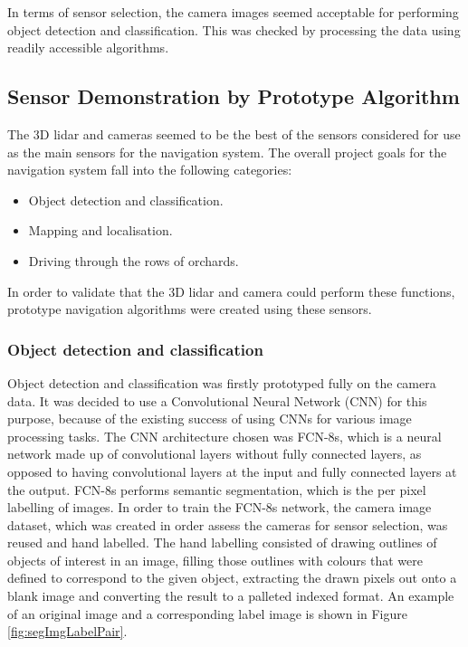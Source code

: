 \documentclass[preprint,authoryear,12pt]{elsarticle}
\begin{document}
    In terms of sensor selection, the camera images seemed acceptable for performing object detection and classification. This was checked by processing the data using readily accessible algorithms.

\subsection{Sensor Demonstration by Prototype Algorithm}
    The 3D lidar and cameras seemed to be the best of the sensors considered for use as the main sensors for the navigation system. The overall project goals for the navigation system fall into the following categories:
    \begin{itemize}
    \item Object detection and classification.
    \item Mapping and localisation.
    \item Driving through the rows of orchards.
    \end{itemize}
    In order to validate that the 3D lidar and camera could perform these functions, prototype navigation algorithms were created using these sensors.

\subsubsection{Object detection and classification}
    Object detection and classification was firstly prototyped fully on the camera data. It was decided to use a Convolutional Neural Network (CNN) for this purpose, because of the existing success of using CNNs for various image processing tasks. The CNN architecture chosen was FCN-8s, which is a neural network made up of convolutional layers without fully connected layers, as opposed to having convolutional layers at the input and fully connected layers at the output. FCN-8s performs semantic segmentation, which is the per pixel labelling of images.
    In order to train the FCN-8s network, the camera image dataset, which was created in order assess the cameras for sensor selection, was reused and hand labelled. The hand labelling consisted of drawing outlines of objects of interest in an image, filling those outlines with colours that were defined to correspond to the given object, extracting the drawn pixels out onto a blank image and converting the result to a palleted indexed format. An example of an original image and a corresponding label image is shown in Figure \ref{fig:segImgLabelPair}.
\end{document}

